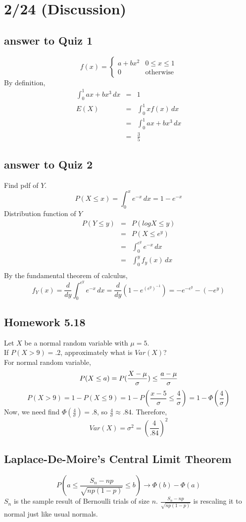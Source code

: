 \section*{2/24 (Discussion)}
  \subsection*{answer to Quiz 1}
    $$
      f(x) = \begin{cases} a + bx^2 & 0 \le x \le 1 \\ 0 & \text{otherwise}
        \end{cases}
    $$
    By definition,
    \begin{eqnarray*}
      \int_0^1 ax + bx^3\,dx & = & 1\\ 
      E(X) & = & \int_0^1 xf(x)\,dx\\
      & = & \int_0^1 ax + bx^3\,dx \\
      & = & \frac{3}{5}
    \end{eqnarray*}

  \subsection*{answer to Quiz 2}
    Find pdf of $Y$.\\
    $$
      P(X \le x) = \int_0^x e^{-x}\,dx = 1 - e^{-x}
    $$
    Distribution function of $Y$\\
    \begin{eqnarray*}
      P(Y \le y) & = & P(logX \le y)\\
      & = & P(X \le e^y)\\
      & = & \int_0^{e^y} e^{-x}\,dx\\
      & = & \int_0^y f_y(x)\,dx\\
    \end{eqnarray*}
    By the fundamental theorem of calculus, 
    $$
      f_Y(x) = \frac{d}{dy} \int_0^{e^y}e^{-x}\,dx = \frac{d}{dy}(1 - 
      e^{(e^{y})^{-1}}) = -e^{-e^{y}} - (-e^{y})
    $$
  \subsection*{Homework 5.18}
    Let $X$ be a normal random variable with $\mu = 5$.\\
    If $P(X > 9) = .2$, approximately what is $Var(X)$?\\
    For normal random variable, 
    $$
      P(X \le a)  =  P(\frac{X - \mu}{\sigma}) \le \frac{a- \mu}{\sigma}\\
    $$
    $$
      P(X > 9) = 1 - P(X \le 9) = 1 - P(\frac{x - 5}{\sigma} \le \frac{4}
      {\sigma}) = 1 - \Phi(\frac{4}{\sigma})
    $$
    Now, we need find $\Phi(\frac{4}{\sigma}) = .8$, so $\frac{4}{\sigma} 
      \approx .84$. Therefore, 
    $$
      Var(X) = \sigma^2 = \left(\frac{4}{.84}\right)^2
    $$
  \subsection*{Laplace-De-Moire's Central Limit Theorem}
    $$
      P(a \le \frac{S_n - np}{\sqrt{np(1-p)}} \le b) \to \Phi(b) - \Phi(a)
    $$
    $S_n$ is the sample result of Bernoulli trials of size $n$. 
    $\frac{S_n - np}{\sqrt{np(1-p)}}$ is rescaling it to normal just like 
    usual normals.
